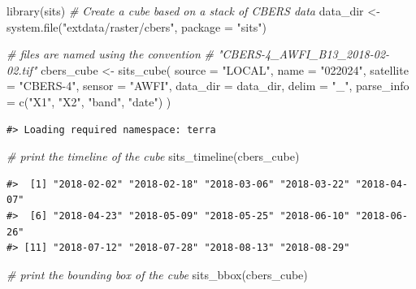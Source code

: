 \documentclass[a4paper,]{tufte-book}
\newenvironment{Shaded}{}{}
\newcommand{\AttributeTok}[1]{\textcolor[rgb]{0.49,0.56,0.16}{#1}}
\newcommand{\CommentTok}[1]{\textcolor[rgb]{0.38,0.63,0.69}{\textit{#1}}}
\newcommand{\FunctionTok}[1]{\textcolor[rgb]{0.02,0.16,0.49}{#1}}
\newcommand{\NormalTok}[1]{#1}
\newcommand{\OtherTok}[1]{\textcolor[rgb]{0.00,0.44,0.13}{#1}}
\newcommand{\StringTok}[1]{\textcolor[rgb]{0.25,0.44,0.63}{#1}}
\begin{document}
\begin{Shaded}
\begin{Highlighting}[]
\FunctionTok{library}\NormalTok{(sits)}
\CommentTok{\# Create a cube based on a stack of CBERS data}
\NormalTok{data\_dir }\OtherTok{\textless{}{-}} \FunctionTok{system.file}\NormalTok{(}\StringTok{"extdata/raster/cbers"}\NormalTok{, }\AttributeTok{package =} \StringTok{"sits"}\NormalTok{)}

\CommentTok{\# files are named using the convention }
\CommentTok{\# "CBERS{-}4\_AWFI\_B13\_2018{-}02{-}02.tif"}
\NormalTok{cbers\_cube }\OtherTok{\textless{}{-}} \FunctionTok{sits\_cube}\NormalTok{(}
      \AttributeTok{source =} \StringTok{"LOCAL"}\NormalTok{,}
      \AttributeTok{name =} \StringTok{"022024"}\NormalTok{,}
      \AttributeTok{satellite =} \StringTok{"CBERS{-}4"}\NormalTok{,}
      \AttributeTok{sensor =} \StringTok{"AWFI"}\NormalTok{,}
      \AttributeTok{data\_dir =}\NormalTok{ data\_dir,}
      \AttributeTok{delim =} \StringTok{"\_"}\NormalTok{,}
      \AttributeTok{parse\_info =} \FunctionTok{c}\NormalTok{(}\StringTok{"X1"}\NormalTok{, }\StringTok{"X2"}\NormalTok{, }\StringTok{"band"}\NormalTok{, }\StringTok{"date"}\NormalTok{)}
\NormalTok{)}
\end{Highlighting}
\end{Shaded}

\begin{verbatim}
#> Loading required namespace: terra
\end{verbatim}

\begin{Shaded}
\begin{Highlighting}[]
\CommentTok{\# print the timeline of the cube}
\FunctionTok{sits\_timeline}\NormalTok{(cbers\_cube)}
\end{Highlighting}
\end{Shaded}

\begin{verbatim}
#>  [1] "2018-02-02" "2018-02-18" "2018-03-06" "2018-03-22" "2018-04-07"
#>  [6] "2018-04-23" "2018-05-09" "2018-05-25" "2018-06-10" "2018-06-26"
#> [11] "2018-07-12" "2018-07-28" "2018-08-13" "2018-08-29"
\end{verbatim}

\begin{Shaded}
\begin{Highlighting}[]
\CommentTok{\# print the bounding box of the cube}
\FunctionTok{sits\_bbox}\NormalTok{(cbers\_cube)}
\end{Highlighting}
\end{Shaded}
\end{document}
